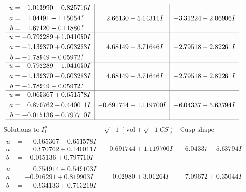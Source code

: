 \documentclass[1p]{elsarticle_modified}
\theoremstyle{definition}
\newcommand{\I}{\sqrt{-1}}
\begin{document}
$$\begin{array}{c|c|c}
\begin{aligned}
u &= -1.013990 - 0.825716 I \\
a &= \phantom{-}1.04491 + 1.15054 I \\
b &= \phantom{-}1.67420 - 0.11880 I\end{aligned}
 & \phantom{-}2.66130 - 5.14311 I & -3.31224 + 2.06906 I \\ \hline\begin{aligned}
u &= -0.792289 + 1.041050 I \\
a &= -1.139370 + 0.603283 I \\
b &= -1.78949 + 0.05972 I\end{aligned}
 & \phantom{-}4.68149 - 3.71646 I & -2.79518 + 2.82261 I \\ \hline\begin{aligned}
u &= -0.792289 - 1.041050 I \\
a &= -1.139370 - 0.603283 I \\
b &= -1.78949 - 0.05972 I\end{aligned}
 & \phantom{-}4.68149 + 3.71646 I & -2.79518 - 2.82261 I \\ \hline\begin{aligned}
u &= \phantom{-}0.065367 + 0.651578 I \\
a &= \phantom{-}0.870762 - 0.440011 I \\
b &= -0.015136 - 0.797710 I\end{aligned}
 & -0.691744 - 1.119700 I & -6.04337 + 5.63794 I\\
 \hline 
 \end{array}$$\newpage$$\begin{array}{c|c|c}  
\text{Solutions to }I^u_{1}& \I (\text{vol} + \sqrt{-1}CS) & \text{Cusp shape}\\
 \hline 
\begin{aligned}
u &= \phantom{-}0.065367 - 0.651578 I \\
a &= \phantom{-}0.870762 + 0.440011 I \\
b &= -0.015136 + 0.797710 I\end{aligned}
 & -0.691744 + 1.119700 I & -6.04337 - 5.63794 I \\ \hline\begin{aligned}
u &= \phantom{-}0.354914 + 0.549103 I \\
a &= -0.916291 + 0.819903 I \\
b &= \phantom{-}0.934133 + 0.713219 I\end{aligned}
 & \phantom{-}0.02980 + 3.01264 I & -7.09672 + 0.35044 I \\ \hline\begin{aligned}

\end{aligned}
\end{array}$$
\end{document}
